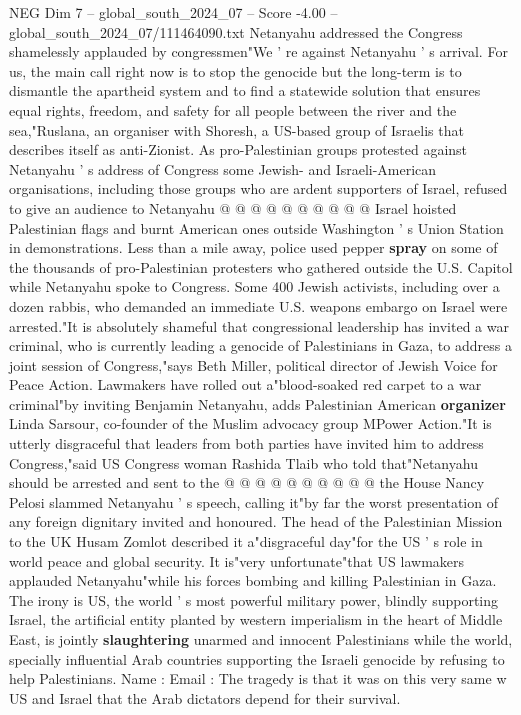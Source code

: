\begin{textsample}{NEG Dim 7 – global\_south\_2024\_07 – Score -4.00 – global\_south\_2024\_07/111464090.txt}
Netanyahu addressed the Congress shamelessly applauded by congressmen"We ' re against Netanyahu ' s arrival.
For us, the main call right now is to stop the genocide but the long-term is to dismantle the apartheid system and to find a statewide solution that ensures equal rights, freedom, and safety for all people between the river and the sea,"Ruslana, an organiser with Shoresh, a US-based group of Israelis that describes itself as anti-Zionist.
As pro-Palestinian groups protested against Netanyahu ' s address of Congress some Jewish- and Israeli-American organisations, including those groups who are ardent supporters of Israel, refused to give an audience to Netanyahu @ @ @ @ @ @ @ @ @ @ Israel hoisted Palestinian flags and burnt American ones outside Washington ' s Union Station in demonstrations.
Less than a mile away, police used pepper \textbf{spray} on some of the thousands of pro-Palestinian protesters who gathered outside the U.S.
Capitol while Netanyahu spoke to Congress.
Some 400 Jewish activists, including over a dozen rabbis, who demanded an immediate U.S. weapons embargo on Israel were arrested."It is absolutely shameful that congressional leadership has invited a war criminal, who is currently leading a genocide of Palestinians in Gaza, to address a joint session of Congress,"says Beth Miller, political director of Jewish Voice for Peace Action.
Lawmakers have rolled out a"blood-soaked red carpet to a war criminal"by inviting Benjamin Netanyahu, adds Palestinian American \textbf{organizer} Linda Sarsour, co-founder of the Muslim advocacy group MPower Action."It is utterly disgraceful that leaders from both parties have invited him to address Congress,"said US Congress woman Rashida Tlaib who told that"Netanyahu should be arrested and sent to the @ @ @ @ @ @ @ @ @ @ the House Nancy Pelosi slammed Netanyahu ' s speech, calling it"by far the worst presentation of any foreign dignitary invited and honoured.
The head of the Palestinian Mission to the UK Husam Zomlot described it a"disgraceful day"for the US ' s role in world peace and global security.
It is"very unfortunate"that US lawmakers applauded Netanyahu"while his forces bombing and killing Palestinian in Gaza.
The irony is US, the world ' s most powerful military power, blindly supporting Israel, the artificial entity planted by western imperialism in the heart of Middle East, is jointly \textbf{slaughtering} unarmed and innocent Palestinians while the world, specially influential Arab countries supporting the Israeli genocide by refusing to help Palestinians.
Name : Email : The tragedy is that it was on this very same w US and Israel that the Arab dictators depend for their survival.

\end{textsample}
